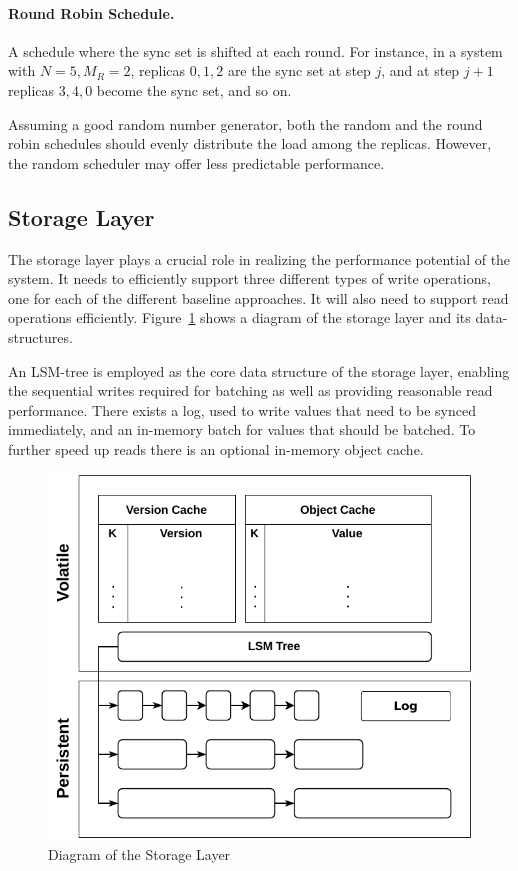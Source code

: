 \paragraph{Round Robin Schedule.} A schedule where the sync set
is shifted at each round. For instance, in a system with $N = 5,
M_R = 2$, replicas $0, 1, 2$ are the sync set at step $j$, and
at step $j + 1$ replicas $3, 4, 0$ become the sync set, and so
on.

Assuming a good random number generator, both the random and the
round robin schedules should evenly distribute the load among the
replicas. However, the random scheduler may offer less
predictable performance.

\subsection{Storage Layer}\label{ssec:storage}

The storage layer plays a crucial role in realizing the
performance potential of the system. It needs to efficiently support
three different types of write operations, one for each of the
different baseline approaches. It will also need to support read operations
efficiently. Figure~\ref{fig:storage_layer} shows a diagram of
the storage layer and its data-structures.

An \ac{LSM-tree} is employed as the core data structure of the storage
layer, enabling the sequential writes required for batching as
well as providing reasonable read performance. There exists a
log, used to write values that need to be synced immediately, and
an in-memory batch for values that should be batched. To further speed
up reads there is an optional in-memory object cache.

\begin{figure}[t]
    \centering
    \includegraphics[width=.75\linewidth]{img/storage_layer}
    \caption{Diagram of the Storage Layer}\label{fig:storage_layer}
\end{figure}


